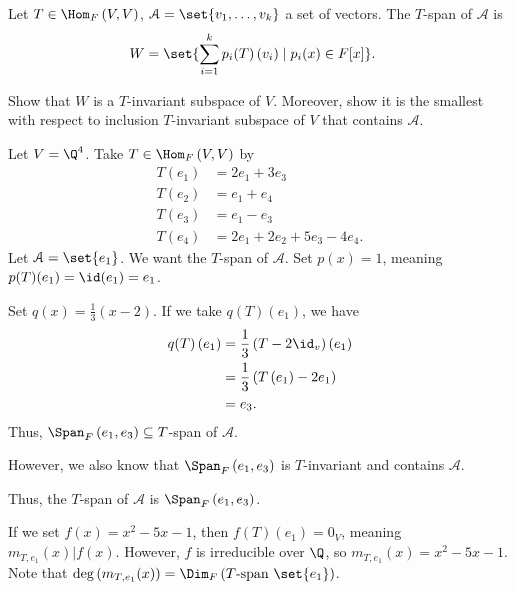 \documentclass[10pt]{mypackage}
\begin{document}
\begin{definition}
  Let $T\in \Hom_{F}\left(V,V\right)$, $\mathcal{A} = \set{v_1,\dots,v_k}$ a set of vectors. The $T$-span of $\mathcal{A}$ is
  \begin{align*}
    W &= \set{\sum_{i=1}^{k}p_i(T)\left(v_i\right)\mid p_i(x)\in F[x]}.
  \end{align*}
\end{definition}
\begin{exercise}
  Show that $W$ is a $T$-invariant subspace of $V$. Moreover, show it is the smallest with respect to inclusion $T$-invariant subspace of $V$ that contains $\mathcal{A}$.
\end{exercise}
\begin{example}
  Let $V = \Q^4$. Take $T\in \Hom_{F}\left(V,V\right)$ by
  \begin{align*}
    T\left(e_1\right) &= 2e_1 + 3e_3\\
    T\left(e_2\right) &= e_1 + e_4\\
    T\left(e_3\right) &= e_1 - e_3\\
    T\left(e_4\right) &= 2e_1 + 2e_2 + 5e_3 - 4e_4.
  \end{align*}
  Let $\mathcal{A} = \set{e_1}$. We want the $T$-span of $\mathcal{A}$. Set $p(x) = 1$, meaning $p(T)(e_1) = \id(e_1) = e_1$.\newline

  Set $q(x) = \frac{1}{3}\left(x-2\right)$. If we take $q(T)\left(e_1\right)$, we have
  \begin{align*}
    q(T)\left(e_1\right) &= \frac{1}{3}\left(T - 2\id_v\right)\left(e_1\right)\\
                         &= \frac{1}{3}\left(T\left(e_1\right) - 2e_1\right)\\
                         &= e_3.
  \end{align*}
  Thus, $\Span_{F}\left(e_1,e_3\right)\subseteq T$-span of $\mathcal{A}$.\newline

  However, we also know that $\Span_{F}\left(e_1,e_3\right)$ is $T$-invariant and contains $\mathcal{A}$.\newline

  Thus, the $T$-span of $\mathcal{A}$ is $\Span_{F}\left(e_1,e_3\right)$.\newline

  If we set $f(x) = x^2 - 5x - 1$, then $f(T)\left(e_1\right) = 0_V$, meaning $m_{T,e_1}(x)|f(x)$. However, $f$ is irreducible over $\Q$, so $m_{T,e_1}(x) = x^2 - 5x - 1$. Note that $\deg\left(m_{T,e_1}(x)\right) = \Dim_{F}\left(T\text{-span }\set{e_1}\right)$.
\end{example}
\end{document}
